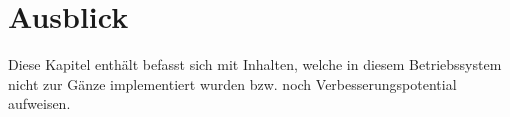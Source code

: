 \section{Ausblick}
\label{Ausblick}
Diese Kapitel enthält befasst sich mit Inhalten, welche in diesem Betriebssystem nicht zur Gänze implementiert wurden bzw. noch Verbesserungspotential aufweisen.



\pagebreak 